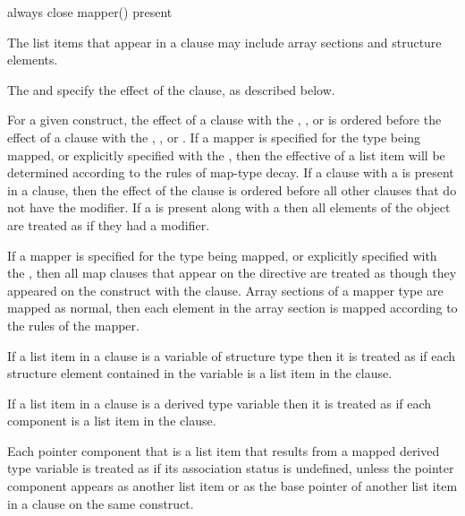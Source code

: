 \begin{indentedcodelist}
always
close
mapper()
present
\end{indentedcodelist}

\descr
The list items that appear in a  clause may include array sections 
and structure elements.

The  and  specify the effect of the 
 clause, as described below.

For a given construct, the effect of a  clause with the ,
, or   is ordered before the effect of a
 clause with the , , or 
. If a mapper is specified for the type being mapped, or
explicitly specified with the  , then the
effective  of a list item will be determined according to the
rules of map-type decay.  If a  clause with a 
 is present in a  clause, then
the effect of the clause is ordered before all other  clauses that do not have
the  modifier.  If a  
is present along with a   then all
elements of the object are treated as if they had a  modifier.

If a mapper is specified for the type being mapped, or explicitly specified with
the  , then all map clauses that appear on the
 directive are treated as though they appeared on the
construct with the  clause.  Array sections of a mapper type are
mapped as normal, then each element in the array section is mapped according to
the rules of the mapper.

\begin{ccppspecific}
If a list item in a  clause is a variable of structure type then it
is treated as if each structure element contained in the variable is a list
item in the clause.
\end{ccppspecific}

\begin{fortranspecific}
If a list item in a  clause is a derived type variable then
it is treated as if each component is a list item in the clause.

Each pointer component that is a list item that results from a mapped
derived type variable is treated as if its association status is
undefined, unless the pointer component appears as another list item
or as the base pointer of another list item in a  clause on
the same construct.
\end{fortranspecific}

